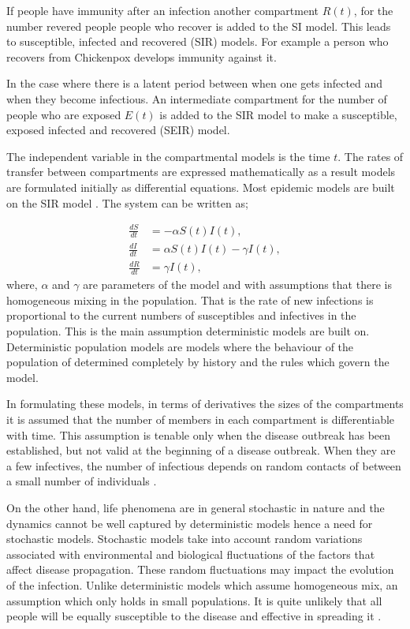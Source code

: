 If people have immunity after an infection another compartment $R(t)$, for the number revered people people who recover is added to the SI model. This leads to susceptible, infected and recovered (SIR) models. For example a person who recovers from Chickenpox develops immunity against it. 

In the case where there is a latent period between when one gets infected and when they become infectious. An intermediate compartment for the number of people who are exposed $E(t)$ is added to the SIR model to make a susceptible, exposed infected and recovered (SEIR) model. 

The independent variable in the compartmental models is the time $t$. The rates of transfer between compartments are expressed mathematically as a result models are formulated initially as differential equations. Most epidemic models are built on the SIR model \citep{m1925applications}. The system can be written as;

\begin{align}\label{eqn1_1}
\frac{dS}{dt} &= -\alpha S(t) I(t), \nonumber  \\
\frac{dI}{dt} &= \alpha S(t) I(t) - \gamma  I(t), \\
\frac{dR}{dt} &= \gamma  I(t), \nonumber  
\end{align}
where, $\alpha$ and $\gamma$ are parameters of the model and with assumptions that there is homogeneous mixing in the population. That is the rate of new infections is proportional to the current numbers of susceptibles and infectives in the population. This is the main assumption deterministic models are built on. Deterministic population  models are models where the behaviour of the population of determined completely by history and the rules which govern the model. 

In formulating these models, in terms of derivatives  the sizes of the compartments it is assumed that the number of members in each compartment is differentiable with time. This assumption is tenable only when the disease outbreak has been established, but not valid at the beginning of a disease outbreak. When they are a few infectives, the number of infectious depends on random contacts of between a small number of individuals \citep{brauer2012mathematical}.
 
On the other hand, life phenomena are in general stochastic in nature and the dynamics cannot be well captured by deterministic models hence a need
for stochastic models. Stochastic models take into account random variations associated with environmental and biological fluctuations of the factors that affect disease propagation. These random fluctuations may impact the evolution of the infection. Unlike deterministic models which assume homogeneous mix, an assumption which only holds in small populations. It is quite unlikely that all people will be equally susceptible to the disease and effective in spreading it \citep{ball1985deterministic}.

